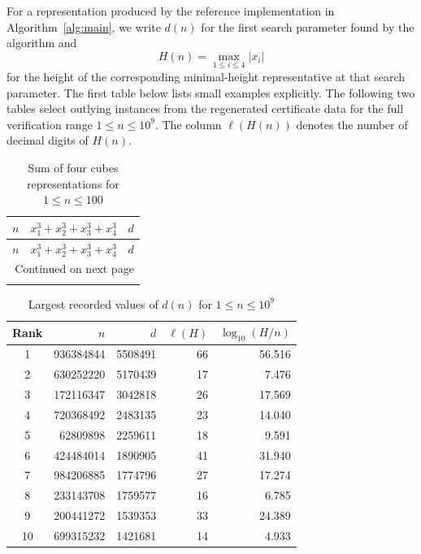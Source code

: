 
For a representation produced by the reference implementation in
Algorithm~\ref{alg:main}, we write $d(n)$ for the first search parameter
found by the algorithm and
\[
        H(n)=\max_{1\leq i\leq 4}|x_i|
\]
for the height of the corresponding minimal-height representative at that
search parameter.  The first table below lists small examples explicitly.
The following two tables select outlying instances from the regenerated
certificate data for the full verification range $1\leq n\leq 10^9$.
The column $\ell(H(n))$ denotes the number of decimal digits of $H(n)$.

\begin{longtable}{c c c}
\caption{Sum of four cubes representations for $1\leq n \leq 100$} \label{tab:solutions}\\
\toprule
$n$ & $x_1^3 + x_2^3 + x_3^3 + x_4^3$ & $d$ \\
\midrule
\endfirsthead
\toprule
$n$ & $x_1^3 + x_2^3 + x_3^3 + x_4^3$ & $d$ \\
\midrule
\endhead
\midrule
\multicolumn{3}{r}{Continued on next page} \\
\endfoot
\bottomrule
\endlastfoot

\end{longtable}

\begin{table}[H]
\centering
\caption{Largest recorded values of $d(n)$ for $1\leq n\leq 10^9$}
\label{tab:largest_d_1e9}
\begin{tabular}{c r r r r}
\toprule
Rank & $n$ & $d$ & $\ell(H)$ & $\log_{10}(H/n)$ \\
\midrule
1 & 936384844 & 5508491 & 66 & 56.516 \\
2 & 630252220 & 5170439 & 17 & 7.476 \\
3 & 172116347 & 3042818 & 26 & 17.569 \\
4 & 720368492 & 2483135 & 23 & 14.040 \\
5 & 62809898 & 2259611 & 18 & 9.591 \\
6 & 424484014 & 1890905 & 41 & 31.940 \\
7 & 984206885 & 1774796 & 27 & 17.274 \\
8 & 233143708 & 1759577 & 16 & 6.785 \\
9 & 200441272 & 1539353 & 33 & 24.389 \\
10 & 699315232 & 1421681 & 14 & 4.933 \\
\bottomrule
\end{tabular}
\end{table}

